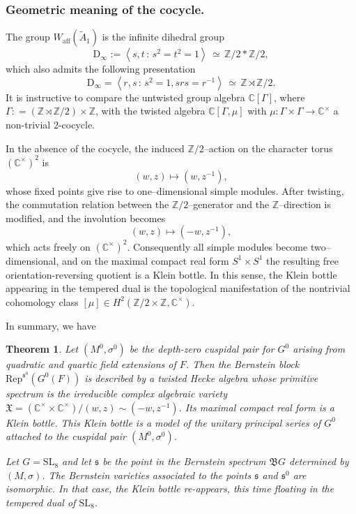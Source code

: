 \documentclass[11pt]{amsart}
\newtheorem{theorem}{Theorem}[section]
\theoremstyle{remark}
\theoremstyle{definition}
\def\fB{\mathfrak{B}}
\def\fX{\mathfrak{X}}
\newcommand{\Z}{\mathbb{Z}}
\newcommand{\C}{\mathbb{C}}
\newcommand{\SL}{\mathrm{SL}}
\newcommand{\fs}{\mathfrak{s}}
\def\fB{\mathfrak{B}}
\begin{document}
\subsubsection{Geometric meaning of the cocycle.}

The group $W_{\mathrm{aff}}(\widetilde{A}_1)$ is the infinite dihedral group
\[\mathrm{D}_\infty:=\left\langle s,t\,:\, s^2=t^2=1\right\rangle\,\simeq\,\Z/2\ast\Z/2,\]
which also admits the following presentation
\[\mathrm{D}_\infty=\left\langle r,s\,:\, s^2=1, srs=r^{-1}\right\rangle\,\simeq\,\Z \rtimes \Z/2.\]
 It is instructive to compare the untwisted group algebra $\C[\Gamma]$, where $\Gamma : = (\Z \rtimes \Z/2) \times \Z$,
with the twisted algebra $\C[\Gamma,\mu]$ with $\mu\colon \Gamma\times \Gamma\to\C^\times$ a non-trivial $2$-cocycle.

In the absence of the cocycle, the induced $\Z/2$--action on the
character torus $(\C^\times)^2$ is
\[
(w,z)\longmapsto (w,z^{-1}),
\]
whose fixed points give rise to one--dimensional simple modules.
After twisting, the commutation relation between the $\Z/2$--generator
and the $\Z$--direction is modified, and the involution becomes
\[
(w,z)\longmapsto (-w,z^{-1}),
\]
which acts freely on $(\C^\times)^2$.
Consequently all simple modules become two--dimensional, and on the
maximal compact real form $S^1\times S^1$ the resulting free
orientation-reversing quotient is a Klein bottle.
In this sense, the Klein bottle appearing in the tempered dual is the
topological manifestation of the nontrivial cohomology class
$[\mu]\in H^2(\Z/2\times\Z,\C^\times)$.


\smallskip

In summary, we have

\begin{theorem}  Let  $(M^0,\sigma^0)$ be the depth-zero
cuspidal pair for $G^0$ arising from quadratic and quartic field extensions of $F$.
Then the  Bernstein block $\mathrm{Rep}^{\fs^0}(G^0(F))$ is described by a twisted Hecke algebra whose primitive spectrum is the irreducible complex algebraic variety $\fX = (\C^\times  \times \C^\times) / (w,z) \sim (-w, z^{-1})$.
Its maximal compact real form is a Klein bottle. This Klein bottle is a model of the unitary principal series of $G^0$ attached  to the cuspidal pair $(M^0, \sigma^0)$.  

Let $G=\SL_8$ and let $\fs$ be the point in the Bernstein spectrum $\fB G$ determined by $(M,\sigma)$.  
The Bernstein varieties associated to the points $\fs$ and $\fs^0$ are isomorphic.   In that case, the Klein bottle re-appears, this time floating in the tempered dual of $\SL_8$.   
\end{theorem}
\end{document}

